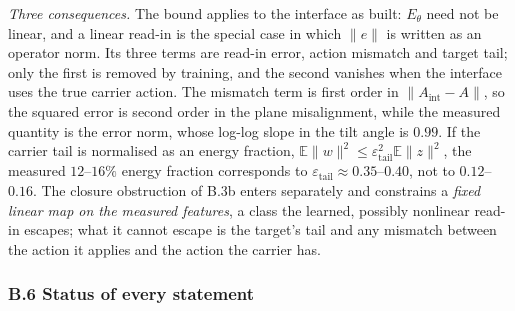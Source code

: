 \textit{Three consequences.} The bound applies to the interface as built: $E_\theta$ need not be linear, and a linear read-in is the special case in which $\lVert e\rVert$ is written as an operator norm. Its three terms are read-in error, action mismatch and target tail; only the first is removed by training, and the second vanishes when the interface uses the true carrier action. The mismatch term is first order in $\lVert A_{\mathrm{int}}-A\rVert$, so the squared error is second order in the plane misalignment, while the measured quantity is the error norm, whose log-log slope in the tilt angle is $0.99$. If the carrier tail is normalised as an energy fraction, $\mathbb E\lVert w\rVert^2\le\varepsilon_{\mathrm{tail}}^2\mathbb E\lVert z\rVert^2$, the measured $12$--$16\%$ energy fraction corresponds to $\varepsilon_{\mathrm{tail}}\approx0.35$--$0.40$, not to $0.12$--$0.16$. The closure obstruction of B.3b enters separately and constrains a \textit{fixed linear map on the measured features}, a class the learned, possibly nonlinear read-in escapes; what it cannot escape is the target's tail and any mismatch between the action it applies and the action the carrier has.

\subsubsection*{B.6 Status of every statement}


